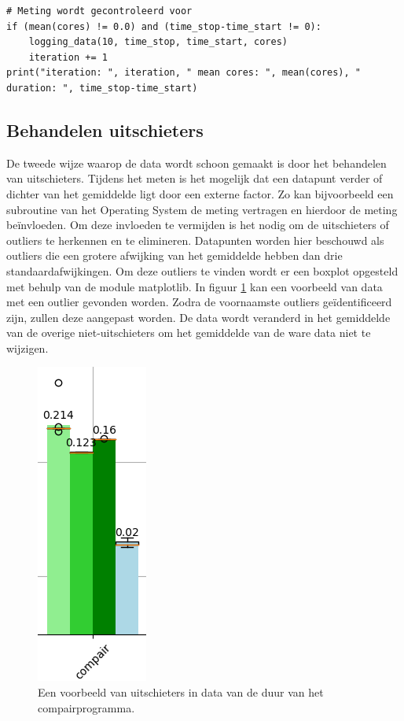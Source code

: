 	\newpage
	
	\begin{lstlisting}[caption={Controleren op meetfouten.}, captionpos=b,label={lst:meetfout}]
# Meting wordt gecontroleerd voor 
if (mean(cores) != 0.0) and (time_stop-time_start != 0):
	logging_data(10, time_stop, time_start, cores)
	iteration += 1
print("iteration: ", iteration, " mean cores: ", mean(cores), " duration: ", time_stop-time_start)
\end{lstlisting}
	
	
	\subsection{Behandelen uitschieters}
	De tweede wijze waarop de data wordt schoon gemaakt is door het behandelen van uitschieters. Tijdens het meten is het mogelijk dat een datapunt verder of dichter van het gemiddelde ligt door een externe factor. Zo kan bijvoorbeeld een subroutine van het Operating System de meting vertragen en hierdoor de meting be\"invloeden. Om deze invloeden te vermijden is het nodig om de uitschieters of outliers te herkennen en te elimineren. Datapunten worden hier beschouwd als outliers die een grotere afwijking van het gemiddelde hebben dan drie standaardafwijkingen. Om deze outliers te vinden wordt er een boxplot opgesteld met behulp van de module matplotlib. In figuur \ref{fig:outliers} kan een voorbeeld van data met een outlier gevonden worden. Zodra de voornaamste outliers ge\"identificeerd zijn, zullen deze aangepast worden. De data wordt veranderd in het gemiddelde van de overige niet-uitschieters om het gemiddelde van de ware data niet te wijzigen. 

	\begin{figure}
		\centering
		\includegraphics{afbeeldingen/outliers.png}
		\caption{Een voorbeeld van uitschieters in data van de duur van het compairprogramma.}
		\label{fig:outliers}
	\end{figure}


